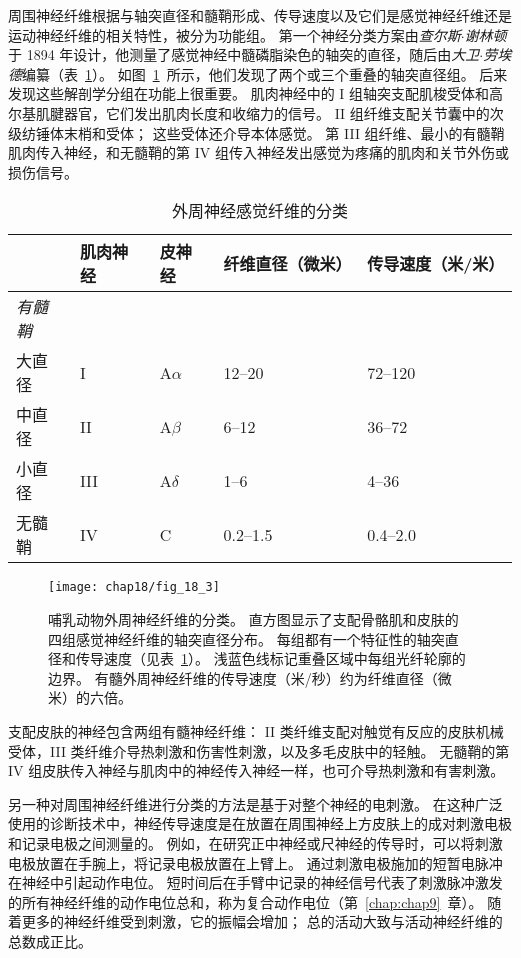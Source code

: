 周围神经纤维根据与轴突直径和髓鞘形成、传导速度以及它们是感觉神经纤维还是运动神经纤维的相关特性，被分为功能组。
第一个神经分类方案由\textit{查尔斯$\cdot$谢林顿}于 1894 年设计，他测量了感觉神经中髓磷脂染色的轴突的直径，随后由\textit{大卫$\cdot$劳埃德}编纂（表~\ref{tab:18_1}）。
如图~\ref{fig:18_3}~所示，他们发现了两个或三个重叠的轴突直径组。
后来发现这些解剖学分组在功能上很重要。
肌肉神经中的 I 组轴突支配肌梭受体和高尔基肌腱器官，它们发出肌肉长度和收缩力的信号。
II 组纤维支配关节囊中的次级纺锤体末梢和受体；
这些受体还介导本体感觉。
第 III 组纤维、最小的有髓鞘肌肉传入神经，和无髓鞘的第 IV 组传入神经发出感觉为疼痛的肌肉和关节外伤或损伤信号。


\begin{table}[htbp]
	\caption{外周神经感觉纤维的分类} \label{tab:18_1} \centering
	\begin{tabular}{lllll}
		\toprule
		 & 肌肉神经 & 皮神经 & 纤维直径（微米） & 传导速度（米/米）\\
		\midrule
		\textit{有髓鞘} &  &  & &  \\
		大直径 & I  & A$\alpha$ & 12–20 & 72–120 \\
		中直径 & II  & A$\beta$ & 6–12 & 36–72 \\
		小直径 & III  & A$\delta$ & 1–6 & 4–36 \\
		无髓鞘 & IV  & C & 0.2–1.5 & 0.4–2.0 \\
		\bottomrule
	\end{tabular}
\end{table}



\begin{figure}[htbp]
	\centering
	\texttt{[image: chap18/fig\_18\_3]}
	\caption{哺乳动物外周神经纤维的分类。
	直方图显示了支配骨骼肌和皮肤的四组感觉神经纤维的轴突直径分布。
	每组都有一个特征性的轴突直径和传导速度（见表~\ref{tab:18_1}）。
	浅蓝色线标记重叠区域中每组光纤轮廓的边界。
	有髓外周神经纤维的传导速度（米/秒）约为纤维直径（微米）的六倍。}
	\label{fig:18_3}
\end{figure}



支配皮肤的神经包含两组有髓神经纤维：
II 类纤维支配对触觉有反应的皮肤机械受体，III 类纤维介导热刺激和伤害性刺激，以及多毛皮肤中的轻触。
无髓鞘的第 IV 组皮肤传入神经与肌肉中的神经传入神经一样，也可介导热刺激和有害刺激。


另一种对周围神经纤维进行分类的方法是基于对整个神经的电刺激。
在这种广泛使用的诊断技术中，神经传导速度是在放置在周围神经上方皮肤上的成对刺激电极和记录电极之间测量的。
例如，在研究正中神经或尺神经的传导时，可以将刺激电极放置在手腕上，将记录电极放置在上臂上。
通过刺激电极施加的短暂电脉冲在神经中引起动作电位。
短时间后在手臂中记录的神经信号代表了刺激脉冲激发的所有神经纤维的动作电位总和，称为复合动作电位（第~\ref{chap:chap9}~章）。
随着更多的神经纤维受到刺激，它的振幅会增加；
总的活动大致与活动神经纤维的总数成正比。


